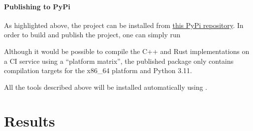 \documentclass{prettytex/ox/mmsc-special-topic}
\begin{document}
  \paragraph{Publishing to PyPi}
  As highlighted above, the project can be installed from \href{https://pypi.org/project/melon-scheduler/}{this PyPi repository}.
  In order to build and publish the project, one can simply run


  Although it would be possible to compile the C++ and Rust implementations on a CI service using a ``platform matrix'', the published package only contains compilation targets for the x86\_64 platform and Python 3.11.

  All the tools described above will be installed automatically using .

  \section{Results}
  \label{sec:results}
\end{document}
